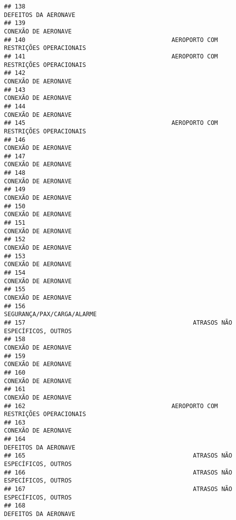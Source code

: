 \documentclass[
]{article}
\begin{document}
\begin{verbatim}
## 138                                                          DEFEITOS DA AERONAVE
## 139                                                           CONEXÃO DE AERONAVE
## 140                                         AEROPORTO COM RESTRIÇÕES OPERACIONAIS
## 141                                         AEROPORTO COM RESTRIÇÕES OPERACIONAIS
## 142                                                           CONEXÃO DE AERONAVE
## 143                                                           CONEXÃO DE AERONAVE
## 144                                                           CONEXÃO DE AERONAVE
## 145                                         AEROPORTO COM RESTRIÇÕES OPERACIONAIS
## 146                                                           CONEXÃO DE AERONAVE
## 147                                                           CONEXÃO DE AERONAVE
## 148                                                           CONEXÃO DE AERONAVE
## 149                                                           CONEXÃO DE AERONAVE
## 150                                                           CONEXÃO DE AERONAVE
## 151                                                           CONEXÃO DE AERONAVE
## 152                                                           CONEXÃO DE AERONAVE
## 153                                                           CONEXÃO DE AERONAVE
## 154                                                           CONEXÃO DE AERONAVE
## 155                                                           CONEXÃO DE AERONAVE
## 156                                                    SEGURANÇA/PAX/CARGA/ALARME
## 157                                               ATRASOS NÃO ESPECÍFICOS, OUTROS
## 158                                                           CONEXÃO DE AERONAVE
## 159                                                           CONEXÃO DE AERONAVE
## 160                                                           CONEXÃO DE AERONAVE
## 161                                                           CONEXÃO DE AERONAVE
## 162                                         AEROPORTO COM RESTRIÇÕES OPERACIONAIS
## 163                                                           CONEXÃO DE AERONAVE
## 164                                                          DEFEITOS DA AERONAVE
## 165                                               ATRASOS NÃO ESPECÍFICOS, OUTROS
## 166                                               ATRASOS NÃO ESPECÍFICOS, OUTROS
## 167                                               ATRASOS NÃO ESPECÍFICOS, OUTROS
## 168                                                          DEFEITOS DA AERONAVE

\end{verbatim}
\end{document}
